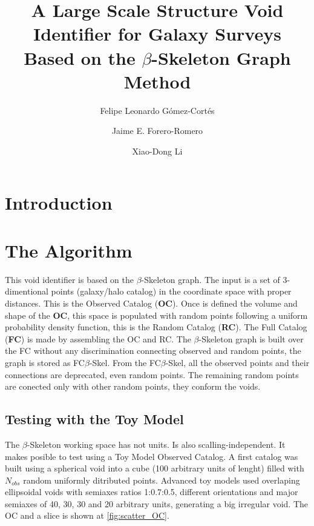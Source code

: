 \documentclass[preprint]{aastex62}
\begin{document}
\title{A Large Scale Structure Void Identifier for Galaxy Surveys Based on the 
$\beta$-Skeleton Graph Method}


\author{Felipe Leonardo Gómez-Cortés}

\author{Jaime E. Forero-Romero}

\author{Xiao-Dong Li}


\begin{abstract}

\end{abstract}


\section{Introduction}


\section{The Algorithm}

This void identifier is based on the $\beta$-Skeleton graph. The input is a
set of 3-dimentional points (galaxy/halo catalog) in the coordinate space with
proper distances. This is the Observed Catalog (\textbf{OC}). Once is defined
the volume and shape of the \textbf{OC}, this space is populated with random
points following a uniform probability density function, this is the Random
Catalog (\textbf{RC}). The Full Catalog (\textbf{FC}) is made by assembling
the OC and RC. The $\beta$-Skeleton graph is built over the FC without any
discrimination connecting observed and random points, the graph is stored as
FC$\beta$-Skel. From the FC$\beta$-Skel, all the observed points and their
connections are deprecated, even random points. The remaining random points
are conected only with other random points, they conform the voids.

\subsection{Testing with the Toy Model}

The $\beta$-Skeleton working space has not units. Is also scalling-independent.
It makes posible to test using a Toy Model Observed Catalog. A first catalog
was built using a spherical void into a cube (100 arbitrary units of lenght)
filled with $N_{obs}$ random uniformly ditributed points. Advanced toy models used
overlaping ellipsoidal voids with semiaxes ratios 1:0.7:0.5, different
orientations and major semiaxes of 40, 30, 30 and 20 arbitrary units,
generating a big irregular void. The OC and a slice is shown at
\ref{fig:scatter_OC}.
\end{document}
